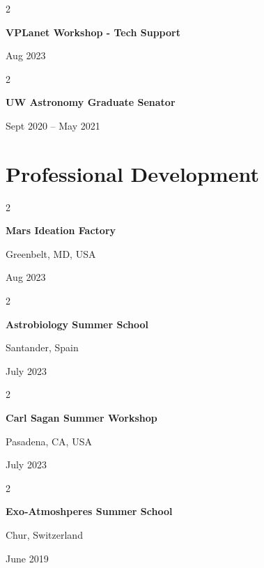 \documentclass[10pt, letterpaper]{article}
\newenvironment{twocolentry}[2][]{
    \onecolentry
    \def\secondColumn{#2}
    \setcolumnwidth{\fill, 4.5 cm}
    \begin{paracol}{2}
}{
    \switchcolumn \raggedleft \secondColumn
    \end{paracol}
    \endonecolentry
} %
\begin{document}
        \vspace{0.2 cm}

        \begin{twocolentry}{
            Aug 2023
        }
            \textbf{VPLanet Workshop - Tech Support}
        \end{twocolentry}


        \vspace{0.2 cm}

        \begin{twocolentry}{
            Sept 2020 – May 2021
        }
            \textbf{UW Astronomy Graduate Senator}
        \end{twocolentry}



    
    \section{Professional Development}



        
        \begin{twocolentry}{
            Greenbelt, MD, USA

        Aug 2023
        }
            \textbf{Mars Ideation Factory}
        \end{twocolentry}


        \vspace{0.2 cm}

        \begin{twocolentry}{
            Santander, Spain

        July 2023
        }
            \textbf{Astrobiology Summer School}
        \end{twocolentry}


        \vspace{0.2 cm}

        \begin{twocolentry}{
            Pasadena, CA, USA

        July 2023
        }
            \textbf{Carl Sagan Summer Workshop}
        \end{twocolentry}


        \vspace{0.2 cm}

        \begin{twocolentry}{
            Chur, Switzerland

        June 2019
        }
            \textbf{Exo-Atmoshperes Summer School}
        \end{twocolentry}
\end{document}
